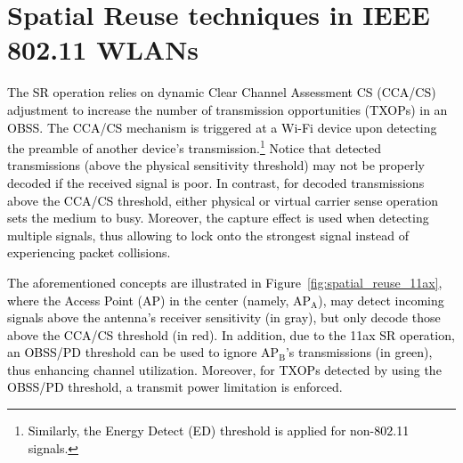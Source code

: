 \documentclass[preprint,12pt]{elsarticle}
\theoremstyle{plain}
\begin{document}
\section{Spatial Reuse techniques in IEEE 802.11 WLANs}%
\label{section:previous_work_sr}

\textcolor{black}{The SR operation relies on dynamic Clear Channel Assessment CS (CCA/CS) adjustment to increase the number of transmission opportunities (TXOPs) in an OBSS. The CCA/CS mechanism is triggered at a Wi-Fi device upon detecting the preamble of another device's transmission.\footnote{\textcolor{black}{Similarly, the Energy Detect (ED) threshold is applied for non-802.11 signals.}} Notice that detected transmissions (above the physical sensitivity threshold) may not be properly decoded if the received signal is poor. In contrast, for decoded transmissions above the CCA/CS threshold, either physical or virtual carrier sense operation sets the medium to busy. Moreover, the capture effect is used when detecting multiple signals, thus allowing to lock onto the strongest signal instead of experiencing packet collisions.}

\textcolor{black}{The aforementioned concepts are illustrated in Figure~\ref{fig:spatial_reuse_11ax}, where the Access Point (AP) in the center (namely, AP$_\text{A}$), may detect incoming signals above the antenna's receiver sensitivity (in gray), but only decode those above the CCA/CS threshold (in red). In addition, due to the 11ax SR operation, an OBSS/PD threshold can be used to ignore AP$_\text{B}$'s transmissions (in green), thus enhancing channel utilization. Moreover, for TXOPs detected by using the OBSS/PD threshold, a transmit power limitation is enforced.}
\end{document}
